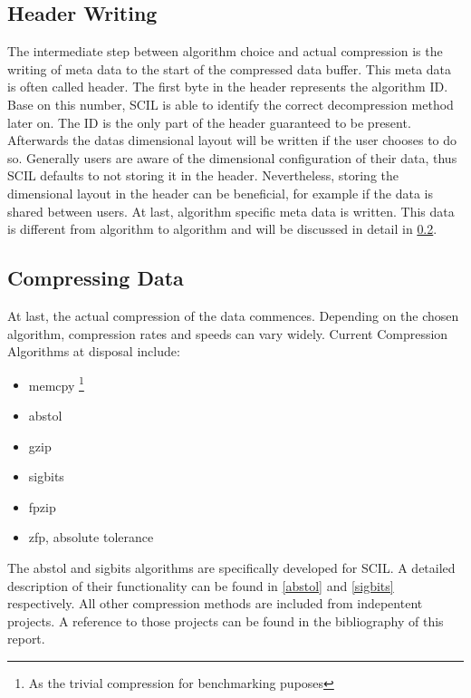\documentclass[
	12pt,
	a4paper,
	BCOR10mm,
	DIV14,
	headsepline,
]{scrreprt}
\begin{document}
\clearpage

\subsection{Header Writing}

\bigskip

The intermediate step between algorithm choice and actual compression is the
writing of meta data to the start of the compressed data buffer. This meta data
is often called header. The first byte in the header represents the algorithm
ID. Base on this number, SCIL is able to identify the correct decompression
method later on. The ID is the only part of the header guaranteed to be present.
Afterwards the datas dimensional layout will be written if the user chooses to
do so. Generally users are aware of the dimensional configuration of their data,
thus SCIL defaults to not storing it in the header. Nevertheless, storing the
dimensional layout in the header can be beneficial, for example if the data is
shared between users. At last, algorithm specific meta data is written. This
data is different from algorithm to algorithm and will be discussed in detail
in \cref{comp_data}.

\bigskip

\subsection{Compressing Data}
\label{comp_data}

\bigskip

At last, the actual compression of the data commences. Depending on the chosen
algorithm, compression rates and speeds can vary widely. Current Compression
Algorithms at disposal include:

\bigskip

\begin{itemize}
	\item memcpy \footnote{As the trivial compression for benchmarking puposes}
	\item abstol
	\item gzip
	\item sigbits
	\item fpzip
	\item zfp, absolute tolerance
\end{itemize}

\setcounter{footnote}{0}

\bigskip

The abstol and sigbits algorithms are specifically developed for SCIL. A
detailed description of their functionality can be found in \cref{abstol} and
\cref{sigbits} respectively. All other compression methods are included from
indepentent projects. A reference to those projects can be found in the
bibliography of this report.
\end{document}
